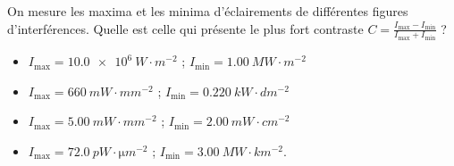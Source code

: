                                 \initialisationPartieGauche %

On mesure les maxima et les minima d'éclairements de différentes figures d'interférences. Quelle est celle qui présente le plus fort contraste $C = \frac{I_{\text{max}}-I_{\text{min}}}{I_{\text{max}}+I_{\text{min}}}$ ?

\initialisationPartieDroite %
\begin{itemize}[itemindent=2em]
	\item[\reponseA{}] $I_{\text{max}}=\SI{10.0e6}{W \cdot m^{-2}}$ ; $I_{\text{min}}=\SI{1.00}{MW \cdot m^{-2}}$
	\item[\reponseB{}] $I_{\text{max}}=\SI{660}{mW \cdot mm^{-2}}$ ; $I_{\text{min}}=\SI{0.220}{kW \cdot dm^{-2}}$
	\item[\reponseC{}] $I_{\text{max}}=\SI{5.00}{mW \cdot mm^{-2}}$ ; $I_{\text{min}}=\SI{2.00}{mW \cdot cm^{-2}}$
	\item[\reponseD{}] $I_{\text{max}}=\SI{72.0}{pW \cdot \micro m^{-2}}$ ; $I_{\text{min}}=\SI{3.00}{MW \cdot km^{-2}}$.
\end{itemize}
\finalisationDuPartageDePage %

\debutEntrainement


